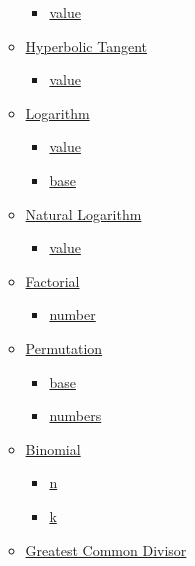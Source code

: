 \begin{itemize}
\begin{itemize}
    \begin{itemize}
    \tightlist
    \item
      \hyperref[functions-cosh-value]{value}
    \end{itemize}
  \item
    \hyperref[functions-tanh]{Hyperbolic Tangent}

    \begin{itemize}
    \tightlist
    \item
      \hyperref[functions-tanh-value]{value}
    \end{itemize}
  \item
    \hyperref[functions-log]{Logarithm}

    \begin{itemize}
    \tightlist
    \item
      \hyperref[functions-log-value]{value}
    \item
      \hyperref[functions-log-base]{base}
    \end{itemize}
  \item
    \hyperref[functions-ln]{Natural Logarithm}

    \begin{itemize}
    \tightlist
    \item
      \hyperref[functions-ln-value]{value}
    \end{itemize}
  \item
    \hyperref[functions-fact]{Factorial}

    \begin{itemize}
    \tightlist
    \item
      \hyperref[functions-fact-number]{number}
    \end{itemize}
  \item
    \hyperref[functions-perm]{Permutation}

    \begin{itemize}
    \tightlist
    \item
      \hyperref[functions-perm-base]{base}
    \item
      \hyperref[functions-perm-numbers]{numbers}
    \end{itemize}
  \item
    \hyperref[functions-binom]{Binomial}

    \begin{itemize}
    \tightlist
    \item
      \hyperref[functions-binom-n]{n}
    \item
      \hyperref[functions-binom-k]{k}
    \end{itemize}
  \item
    \hyperref[functions-gcd]{Greatest Common Divisor}


\end{itemize}
\end{itemize}
